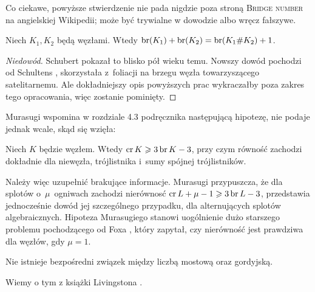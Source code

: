 Co ciekawe, powyższe stwierdzenie nie pada nigdzie poza stroną \textsc{Bridge number} na angielskiej Wikipedii; może być trywialne w dowodzie albo wręcz fałszywe.

\begin{proposition}
\label{prp:bridge_additive}%
    Niech $K_1, K_2$ będą węzłami.
    Wtedy $\operatorname{br} (K_1) + \operatorname{br}(K_2) = \operatorname{br}(K_1 \# K_2) + 1$.
\end{proposition}

\begin{proof}[Niedowód]
%
%
    Schubert \cite[s. 279]{schubert1954} pokazał to blisko pół wieku temu.
    Nowszy dowód pochodzi od Schultens \cite{schultens2003}, skorzystała z~foliacji na brzegu węzła towarzyszącego satelitarnemu.
    Ale dokładniejszy opis powyższych prac wykraczałby poza zakres tego opracowania, więc zostanie pominięty.
\end{proof}

Murasugi wspomina w rozdziale 4.3 podręcznika \cite{murasugi1996} następującą hipotezę, nie podaje jednak wcale, skąd się wzięła:
%

\begin{conjecture}
%
    Niech $K$ będzie węzłem.
    Wtedy $\operatorname{cr} K \geqslant 3 \operatorname{br} K - 3$, przy czym równość zachodzi dokładnie dla niewęzła, trójlistnika i~sumy spójnej trójlistników.
\end{conjecture}

Należy więc uzupełnić brakujące informacje.
Murasugi \cite{murasugi1988} przypuszcza, że dla splotów o~$\mu$~ogniwach zachodzi nierównosć $\operatorname{cr} L + \mu - 1 \geqslant 3 \operatorname{br} L - 3$, przedstawia jednocześnie dowód jej szczególnego przypadku, dla alternujących splotów algebraicznych.
%
Hipoteza Murasugiego stanowi uogólnienie dużo starszego problemu pochodzącego od Foxa \cite{fox1950}, który zapytał, czy nierówność jest prawdziwa dla węzłów, gdy $\mu = 1$.
%

\begin{proposition}
%
\label{no_relation_bridge_unknotting}%
    Nie istnieje bezpośredni związek między liczbą mostową oraz gordyjską.
\end{proposition}

Wiemy o tym z książki Livingstona \cite[s. 146]{livingston1993}.

